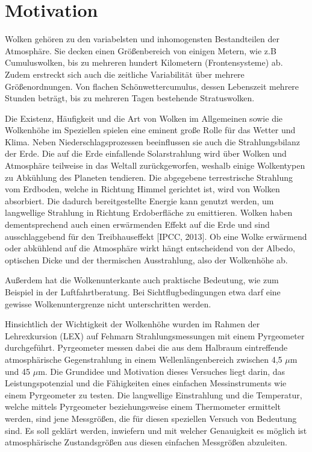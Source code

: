 \documentclass[10pt,a4paper,compsoc,peer review papers]{IEEEtran}
\begin{document}
\section{Motivation}
Wolken gehören zu den variabelsten und inhomogensten Bestandteilen der
Atmosphäre. Sie decken einen Größenbereich von einigen Metern, wie z.B
Cumuluswolken, bis zu mehreren hundert Kilometern (Frontensysteme) ab. Zudem
erstreckt sich auch die zeitliche Variabilität über mehrere Größenordnungen.
Von flachen Schönwettercumulus, dessen Lebenszeit mehrere Stunden beträgt, bis
zu mehreren Tagen bestehende Stratuswolken.

Die Existenz, Häufigkeit und die Art von Wolken im Allgemeinen sowie die
Wolkenhöhe im Speziellen spielen eine eminent große Rolle für das Wetter und
Klima. Neben Niederschlagsprozessen beeinflussen sie auch die Strahlungsbilanz
der Erde. Die auf die Erde einfallende Solarstrahlung wird über Wolken und
Atmosphäre teilweise in das Weltall zurückgeworfen, weshalb einige Wolkentypen
zu Abkühlung des Planeten tendieren. Die abgegebene terrestrische Strahlung vom
Erdboden, welche in Richtung Himmel gerichtet ist, wird von Wolken absorbiert.
Die dadurch bereitgestellte Energie kann genutzt werden, um langwellige
Strahlung in Richtung Erdoberfläche zu emittieren. Wolken haben dementsprechend
auch einen erwärmenden Effekt auf die Erde und sind ausschlaggebend für den
Treibhauseffekt [IPCC, 2013]. Ob eine Wolke erwärmend oder abkühlend auf die
Atmosphäre wirkt hängt entscheidend von der Albedo, optischen Dicke und der
thermischen Ausstrahlung, also der Wolkenhöhe ab.

Außerdem hat die Wolkenunterkante auch praktische Bedeutung, wie zum Beispiel
in der Luftfahrtberatung. Bei Sichtflugbedingungen etwa darf eine gewisse
Wolkenuntergrenze nicht unterschritten werden.

Hinsichtlich der Wichtigkeit der Wolkenhöhe wurden im Rahmen der Lehrexkursion
(LEX) auf Fehmarn Strahlungsmessungen mit einem Pyrgeometer durchgeführt.
Pyrgeometer messen dabei die aus dem Halbraum eintreffende atmosphärische
Gegenstrahlung in einem Wellenlängenbereich zwischen 4,5 $\mu$m und 45 $\mu$m.
Die Grundidee und Motivation dieses Versuches liegt darin, das
Leistungspotenzial und die Fähigkeiten eines einfachen Messinstruments wie
einem Pyrgeometer zu testen. Die langwellige Einstrahlung und die Temperatur,
welche mittels Pyrgeometer beziehungsweise einem Thermometer ermittelt werden,
sind jene Messgrößen, die für diesen speziellen Versuch von Bedeutung sind. Es
soll geklärt werden, inwiefern und mit welcher Genauigkeit es möglich ist
atmosphärische Zustandsgrößen aus diesen einfachen Messgrößen abzuleiten.
\end{document}

